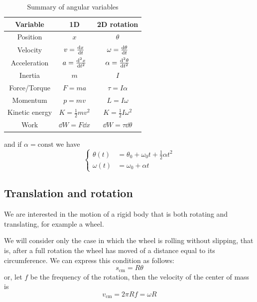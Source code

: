 \documentclass[14pt]{extarticle}
\begin{document}
\begin{table}[H]
    \centering
    \begin{tabular}{|c|c|c|}
        \hline
        \textbf{Variable} & \textbf{1D}             & \textbf{2D rotation}         \\
        \hline
        Position          & $x$                     & $\theta$                     \\
        Velocity          & $v = \dv{x}{t}$         & $\omega = \dv{\theta}{t}$    \\
        Acceleration      & $a = \dv[2]{x}{t}$      & $\alpha = \dv[2]{\theta}{t}$ \\
        Inertia           & $m$                     & $I$                          \\
        Force/Torque      & $F = ma$                & $\tau = I \alpha$            \\
        Momentum          & $p = mv$                & $L = I \omega$               \\
        Kinetic energy    & $K = \frac{1}{2} m v^2$ & $K = \frac{1}{2} I \omega^2$ \\
        Work              & $\dd{W} = F \dd{x}$     & $\dd{W} = \tau \dd{\theta}$  \\
        \hline
    \end{tabular}
    \caption{Summary of angular variables}
    \label{tab:angular-variables}
\end{table}

and if $\alpha = \text{const}$ we have
\begin{equation}
    \begin{cases}
        \theta(t) & = \theta_0 + \omega_0 t + \frac{1}{2}\alpha t^2 \\
        \omega(t) & = \omega_0 + \alpha t
    \end{cases}
\end{equation}

\subsection{Translation and rotation}

We are interested in the motion of a rigid body that is both rotating and translating, for example a wheel.

We will consider only the case in which the wheel is rolling without slipping, that is, after a full rotation the wheel has moved of a distance equal to its circumference.
We can express this condition as follows:
\begin{equation}
    s_{\text{cm}} = R \theta
\end{equation}
or, let $f$ be the frequency of the rotation, then the velocity of the center of mass is
\begin{equation}
    v_{\text{cm}} = 2 \pi R f = \omega R
\end{equation}
\end{document}
